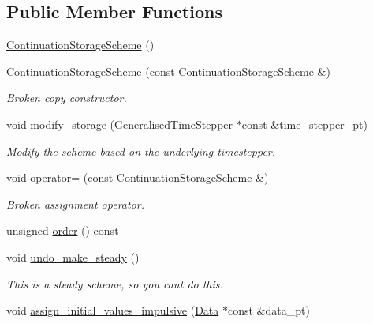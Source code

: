 \subsection*{Public Member Functions}
\begin{DoxyCompactItemize}
\item 
\hyperlink{classoomph_1_1ContinuationStorageScheme_afc4105a9e848ef6ea1320611d9d65c9b}{Continuation\+Storage\+Scheme} ()
\item 
\hyperlink{classoomph_1_1ContinuationStorageScheme_a7b7f8451e6b9125f36136bdadca73fad}{Continuation\+Storage\+Scheme} (const \hyperlink{classoomph_1_1ContinuationStorageScheme}{Continuation\+Storage\+Scheme} \&)
\begin{DoxyCompactList}\small\item\em Broken copy constructor. \end{DoxyCompactList}\item 
void \hyperlink{classoomph_1_1ContinuationStorageScheme_a48726b336985f9c71e10a01fdded177b}{modify\+\_\+storage} (\hyperlink{classoomph_1_1GeneralisedTimeStepper}{Generalised\+Time\+Stepper} $\ast$const \&time\+\_\+stepper\+\_\+pt)
\begin{DoxyCompactList}\small\item\em Modify the scheme based on the underlying timestepper. \end{DoxyCompactList}\item 
void \hyperlink{classoomph_1_1ContinuationStorageScheme_a27c17cf31af802a84973b02d13268f89}{operator=} (const \hyperlink{classoomph_1_1ContinuationStorageScheme}{Continuation\+Storage\+Scheme} \&)
\begin{DoxyCompactList}\small\item\em Broken assignment operator. \end{DoxyCompactList}\item 
unsigned \hyperlink{classoomph_1_1ContinuationStorageScheme_ab9ebd03333ee68a6ec5038386134d79a}{order} () const
\item 
void \hyperlink{classoomph_1_1ContinuationStorageScheme_adf4be6b7cf66d8b8f4dfed7520d43afb}{undo\+\_\+make\+\_\+steady} ()
\begin{DoxyCompactList}\small\item\em This is a steady scheme, so you can\textquotesingle{}t do this. \end{DoxyCompactList}\item 
void \hyperlink{classoomph_1_1ContinuationStorageScheme_a24344971f7f5dd254488f7373ceb2074}{assign\+\_\+initial\+\_\+values\+\_\+impulsive} (\hyperlink{classoomph_1_1Data}{Data} $\ast$const \&data\+\_\+pt)

\end{DoxyCompactItemize}
